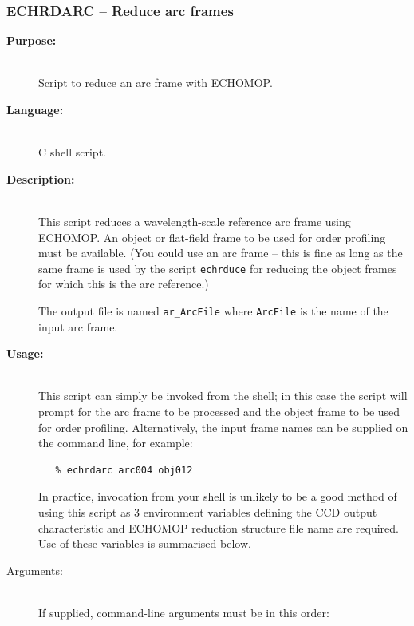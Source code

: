 \documentclass[twoside,11pt]{article}
\newcommand{\stardocinitials}  {SC}
\newcommand{\stardocnumber}    {3.2-0} %
\newcommand{\stardocname}{\stardocinitials /\stardocnumber}
\newcommand{\htmlref}[2]{#1}
\newcommand{\xref}[3]{#1}
\newcommand{\xlabel}[1]{}
\renewcommand{\_}{\texttt{\symbol{95}}}
\newcommand{\scspec}[2]{#1}
\newcommand{\scspec}[2]{#2}
\begin{document}
\newpage
\subsubsection{\label{se_echrdarc}\xlabel{echrdarc}ECHRDARC
                \scspec{--}{-} Reduce arc frames}
\markboth{ECHRDARC}{\stardocname}

\begin{description}

\item [{\bf Purpose:}] \mbox{} \\
     Script to reduce an arc frame with \xref{ECHOMOP}{sun152}{}.

\item [{\bf Language:}] \mbox{} \\
     C shell script.

\item [{\bf Description:}] \mbox{} \\
     This script reduces a wavelength-scale reference arc frame using
     ECHOMOP.  An object or flat-field frame to be used for order
     profiling must be available.  (You could use an arc frame
     \scspec{--}{-} this is fine as long as the same frame is
     used by the script \htmlref{\texttt{echrduce}}{se_echrduce}
     for reducing the object frames for which this is the arc
     reference.)

     The output file is named \verb+ar_ArcFile+ where \verb+ArcFile+ is
     the name of the input arc frame.

\item [{\bf Usage:}] \mbox{} \\
     This script can simply be invoked from the shell; in this case
     the script will prompt for the arc frame to be processed and the
     object frame to be used for order profiling.
     Alternatively, the input frame names can be supplied on the
     command line, for example:

\begin{verbatim}
   % echrdarc arc004 obj012
\end{verbatim}

     In practice, invocation from your shell is unlikely to be a good
     method of using this script as 3 environment variables defining
     the CCD output characteristic and ECHOMOP reduction structure file
     name are required.  Use of these variables is summarised below.

\item [Arguments:] \mbox{} \\
     If supplied, command-line arguments must be in this order:


\end{description}
\end{document}
